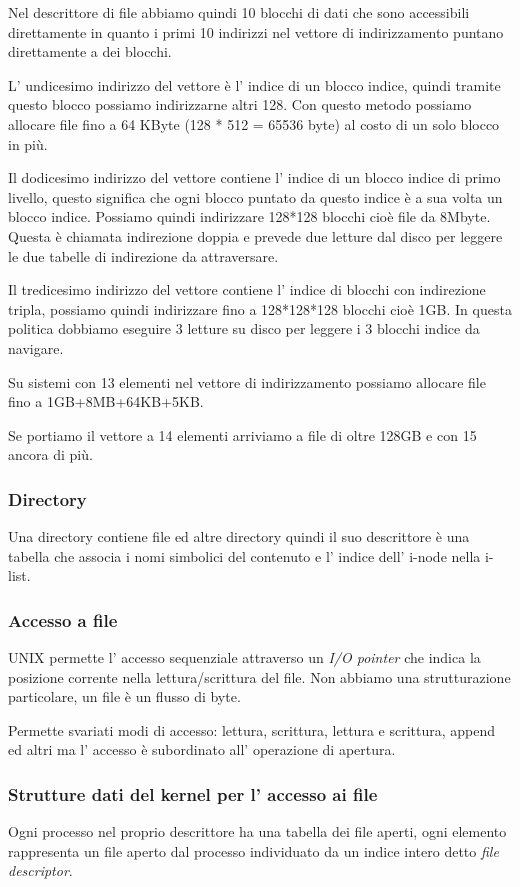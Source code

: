 Nel descrittore di file abbiamo quindi 10 blocchi di dati che sono accessibili direttamente in quanto i primi 10 indirizzi nel vettore di indirizzamento puntano direttamente a dei blocchi.

L' undicesimo indirizzo del vettore è l' indice di un blocco indice, quindi tramite questo blocco possiamo indirizzarne altri 128.
Con questo metodo possiamo allocare file fino a 64 KByte (128 * 512 = 65536 byte) al costo di un solo blocco in più.

Il dodicesimo indirizzo del vettore contiene l' indice di un blocco indice di primo livello, questo significa che ogni blocco puntato da questo indice è a sua volta un blocco indice.
Possiamo quindi indirizzare 128*128 blocchi cioè file da 8Mbyte.
Questa è chiamata indirezione doppia e prevede due letture dal disco per leggere le due tabelle di indirezione da attraversare.

Il tredicesimo indirizzo del vettore contiene l' indice di blocchi con indirezione tripla, possiamo quindi indirizzare fino a 128*128*128 blocchi cioè 1GB.
In questa politica dobbiamo eseguire 3 letture su disco per leggere i 3 blocchi indice da navigare.

Su sistemi con 13 elementi nel vettore di indirizzamento possiamo allocare file fino a 1GB+8MB+64KB+5KB.

Se portiamo il vettore a 14 elementi arriviamo a file di oltre 128GB e con 15 ancora di più.


\subsubsection{Directory}
Una directory contiene file ed altre directory quindi il suo descrittore è una tabella che associa i nomi simbolici del contenuto e l' indice dell' i-node nella i-list.

\subsubsection{Accesso a file}
UNIX permette l' accesso sequenziale attraverso un \emph{I/O pointer} che indica la posizione corrente nella lettura/scrittura del file.
Non abbiamo una strutturazione particolare, un file è un flusso di byte.

Permette svariati modi di accesso: lettura, scrittura, lettura e scrittura, append ed altri ma l' accesso è subordinato all' operazione di apertura.


\subsubsection{Strutture dati del kernel per l' accesso ai file}
Ogni processo nel proprio descrittore ha una tabella dei file aperti, ogni elemento rappresenta un file aperto dal processo individuato da un indice intero detto \emph{file descriptor}.

